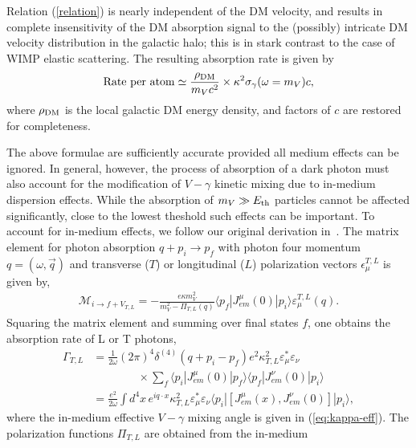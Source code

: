 \documentclass[prd,reprint,nofootinbib,notitlepage,aps,tightenlines,preprintnumbers,amsmath,amssymb,showpacs,superscriptaddress]{revtex4-1}
\begin{document}
Relation (\ref{relation}) is nearly independent of the DM velocity,
and results in complete insensitivity of the DM absorption signal to the
(possibly) intricate DM velocity distribution in the
galactic halo; this is in stark contrast to the case of WIMP elastic
scattering.  The resulting absorption rate is given by
\begin{equation}
{\rm Rate~per~atom} \simeq \frac{\rho_{\rm DM}}{m_Vc^2} \times \kappa^2\sigma_\gamma(\omega=m_V)c,
\label{rate}
\end{equation}
where $\rho_{\rm DM}$ is the local galactic DM energy density, and
factors of $c$ are restored for completeness.

The above formulae are sufficiently accurate provided all medium
effects can be ignored.  In general, however, the process of
absorption of a dark photon must also account for the modification of
$V-\gamma$ kinetic mixing due to in-medium dispersion effects.  While
the absorption of $m_V \gg E_{\rm th}$ particles cannot be affected
significantly, close to the lowest theshold such effects can be
important.
%
%
%
To account for in-medium effects, we follow our original derivation
in~\cite{An:2013yua}.  The matrix element for photon absorption
$q + p_i \to p_f$ with photon four momentum $q=(\omega, \vec q)$ and
transverse ($T$) or longitudinal ($L$) polarization vectors
$\epsilon_{\mu}^{T,L}$ is given by,
%
\begin{align}
  \mathcal{M}_{i \to f + V_{T,L}} = - \frac{e \kappa m_V^2}{m_V^2
    -\Pi_{T,L}(q)} \langle p_f |  J^{\mu}_{em} (0) | p_i \rangle
  \varepsilon_{\mu}^{T,L}(q) .
\end{align}
%
Squaring the matrix element and summing over final states $f$, one
obtains the  absorption rate of L or T photons,
%
\begin{align}
\label{eq:absorptionStueck}
  \Gamma_{T,L} & = \frac{1}{2\omega} (2\pi)^4 \delta^{(4)} (q + p_i - p_f) e^2
  \kappa_{T,L}^2 \varepsilon_{\mu}^{*} \varepsilon_{\nu} \nonumber\\
  & \qquad\qquad \times \sum_f
  \langle p_i | J^{\mu}_{em} (0) | p_f \rangle \langle p_f |
  J^{\nu}_{em} (0) | p_i \rangle  \\
  & = \frac{e^2}{2\omega} \int d^4x\, e^{i q\cdot x} \kappa_{T,L}^2
  \varepsilon_{\mu}^{*} \varepsilon_{\nu} \langle p_i | [ J^{\mu}_{em} (x) ,
  J^{\nu}_{em} (0) ] | p_i \rangle ,
\end{align}
%
where the in-medium effective $V-\gamma$ mixing angle is given in
(\ref{eq:kappa-eff}).
%
The polarization functions $\Pi_{T,L}$ are obtained from the in-medium
\end{document}
